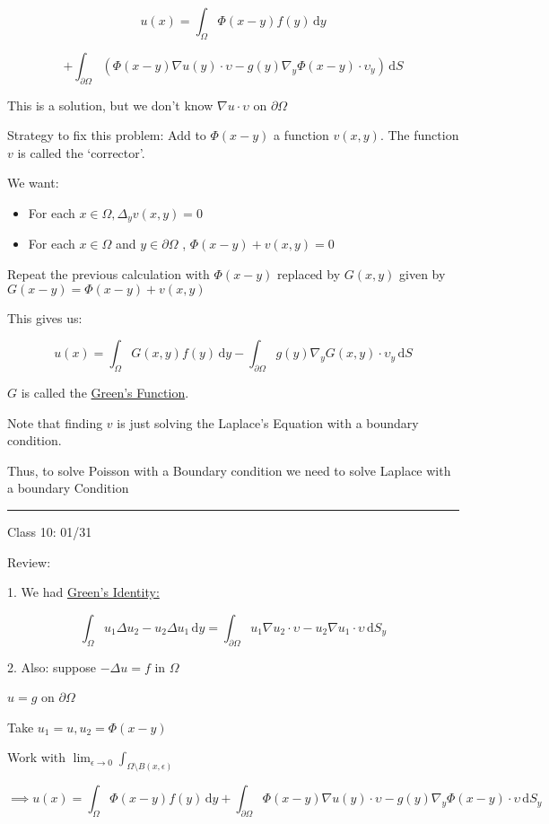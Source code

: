 \documentclass{article}
\theoremstyle{definition}
\begin{document}
\[
    u(x) = \int_{\Omega}^{} \Phi(x-y)f(y) \,\mathrm{d}y 
\]

\[
    + \int_{\partial \Omega }^{} \left( \Phi(x-y)\nabla u(y)\cdot \upsilon - g(y)\nabla_y \Phi(x-y)\cdot \upsilon_y \right)  \,\mathrm{d}S 
\]

This is a solution, but we don't know \(\nabla u\cdot \upsilon\) on \(\partial \Omega\) 

Strategy to fix this problem: Add to \(\Phi(x-y)\) a function \(v(x,y)\). The function \(v\) is called the `corrector'.

We want:

\begin{itemize}
    \item For each \(x\in \Omega, \Delta_y v(x,y)=0\)
    \item For each \(x\in \Omega \) and \(y\in \partial \Omega \) , \(\Phi(x-y)+v(x,y)=0\) 
\end{itemize}

Repeat the previous calculation with \(\Phi(x-y)\) replaced by \(G(x,y)\) given by \(G(x-y)=\Phi(x-y)+v(x,y)\) 

This gives us:

\[
    u(x)=\int_{\Omega}^{} G(x,y)f(y) \,\mathrm{d}y - \int_{\partial \Omega }^{} g(y)\nabla_y G(x,y)\cdot \upsilon _y \,\mathrm{d}S 
\]

\(G\) is called the \underline{Green's Function}.

Note that finding \(v\) is just solving the Laplace's Equation with a boundary condition. 

Thus, to solve Poisson with a Boundary condition we need to solve Laplace with a boundary Condition

\hfil
\hrule

Class 10: 01/31

Review:

1. We had \underline{Green's Identity:}

\[
    \int_\Omega u_1 \Delta u_2 - u_2 \Delta u_1 \, \mathrm{d} y = \int_{\partial \Omega } u_1 \nabla u_2 \cdot \upsilon - u_2 \nabla u_1 \cdot \upsilon \, \mathrm{d} S_y
\]

2. Also: suppose \(-\Delta u = f\) in \(\Omega \)

\(u = g\) on \(\partial \Omega \) 

Take \(u_1 = u, u_2 = \Phi(x-y)\) 

Work with \(\lim_{\epsilon  \to 0} \int_{\Omega \setminus B(x,\epsilon )}^{}  \) 

\[
    \implies u(x) = \int_{\Omega}^{} \Phi(x-y)f(y) \,\mathrm{d}y + \int_{\partial \Omega}^{} \Phi(x-y)\nabla u(y)\cdot \upsilon - g(y)\nabla_y \Phi(x-y)\cdot \upsilon  \,\mathrm{d}S_y 
\]
\end{document}
